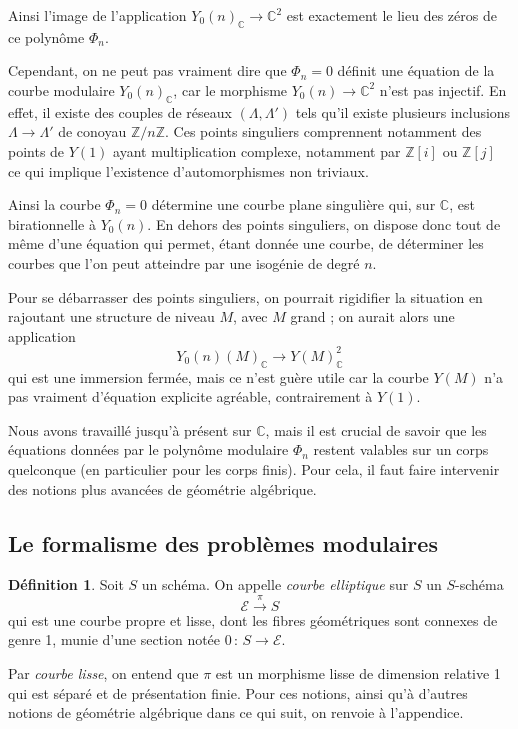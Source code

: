 \documentclass[11pt,a4paper]{article}
\newcommand{\Z}{\mathbb{Z}}
\newcommand{\C}{\mathbb{C}}
\newcommand{\E}{\mathcal{E}}
\newcommand{\vers}{\longrightarrow}
\newcommand{\de}{\,:\,}
\theoremstyle{definition}
\newtheorem*{defi}{Définition}
\begin{document}
Ainsi l'image de l'application $Y_0(n)_\C\vers \C^2$ est exactement le lieu des zéros de ce polynôme $\Phi_n$.

Cependant, on ne peut pas vraiment dire que $\Phi_n=0$ définit une équation de la courbe modulaire $Y_0(n)_\C$, car le morphisme $Y_0(n)\vers \C^2$ n'est pas injectif. En effet, il existe des couples de réseaux $(\Lambda, \Lambda')$ tels qu'il existe plusieurs inclusions $\Lambda\vers\Lambda'$ de conoyau $\Z/n\Z$. Ces points singuliers comprennent notamment des points de $Y(1)$ ayant multiplication complexe, notamment par $\Z[i]$ ou $\Z[j]$ ce qui implique l'existence d'automorphismes non triviaux.

Ainsi la courbe $\Phi_n=0$ détermine une courbe plane singulière qui, sur $\C$, est birationnelle à $Y_0(n)$. En dehors des points singuliers, on dispose donc tout de même d'une équation qui permet, étant donnée une courbe, de déterminer les courbes que l'on peut atteindre par une isogénie de degré $n$.

Pour se débarrasser des points singuliers, on pourrait rigidifier la situation en rajoutant une structure de niveau $M$, avec $M$ grand ; on aurait alors une application
$$Y_0(n)(M)_\C\vers Y(M)_\C^2$$
qui est une immersion fermée, mais ce n'est guère utile car la courbe $Y(M)$ n'a pas vraiment d'équation explicite agréable, contrairement à $Y(1)$.

Nous avons travaillé jusqu'à présent sur $\C$, mais il est crucial de savoir que les équations données par le polynôme modulaire $\Phi_n$ restent valables sur un corps quelconque (en particulier pour les corps finis). Pour cela, il faut faire intervenir des notions plus avancées de géométrie algébrique.


\subsection{Le formalisme des problèmes modulaires}

\begin{defi}
Soit $S$ un schéma. On appelle \emph{courbe elliptique} sur $S$ un $S$-schéma
$$\E \overset{\pi}{\vers} S$$
qui est une courbe propre et lisse, dont les fibres géométriques sont connexes de genre 1, munie d'une section notée $0\de S\vers \E$.
\end{defi}

Par \emph{courbe lisse}, on entend que $\pi$ est un morphisme lisse de dimension relative 1 qui est séparé et de présentation finie. Pour ces notions, ainsi qu'à d'autres notions de géométrie algébrique dans ce qui suit, on renvoie à l'appendice.
\end{document}
